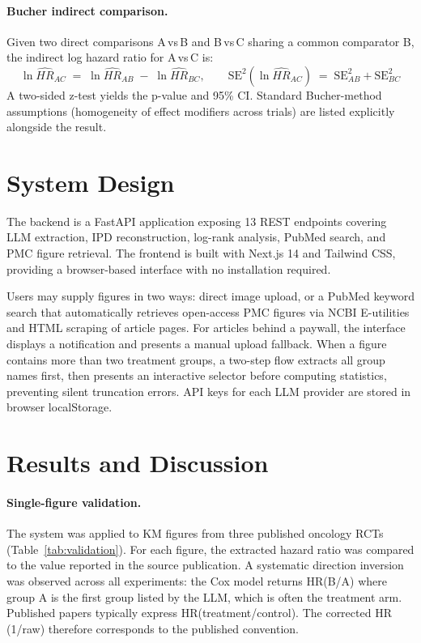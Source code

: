 \documentclass{amia}
\begin{document}
\paragraph{Bucher indirect comparison.}
Given two direct comparisons A\,vs\,B and B\,vs\,C sharing a common
comparator B, the indirect log hazard ratio for A\,vs\,C is:
\[
  \ln\widehat{HR}_{AC} \;=\; \ln\widehat{HR}_{AB} \;-\; \ln\widehat{HR}_{BC},
  \qquad
  \mathrm{SE}^2(\ln\widehat{HR}_{AC}) \;=\;
      \mathrm{SE}^2_{AB} + \mathrm{SE}^2_{BC}
\]
A two-sided z-test yields the p-value and 95\% CI\cite{bucher1997}.
Standard Bucher-method assumptions (homogeneity of effect modifiers across
trials) are listed explicitly alongside the result.

\section*{System Design}

The backend is a FastAPI application exposing 13 REST endpoints covering LLM
extraction, IPD reconstruction, log-rank analysis, PubMed search, and PMC
figure retrieval. The frontend is built with Next.js 14 and Tailwind CSS,
providing a browser-based interface with no installation required.

Users may supply figures in two ways: direct image upload, or a PubMed
keyword search that automatically retrieves open-access PMC figures via NCBI
E-utilities and HTML scraping of article pages. For articles behind a
paywall, the interface displays a notification and presents a manual upload
fallback. When a figure contains more than two treatment groups, a two-step
flow extracts all group names first, then presents an interactive selector
before computing statistics, preventing silent truncation errors. API keys
for each LLM provider are stored in browser localStorage.

\section*{Results and Discussion}

\paragraph{Single-figure validation.}
The system was applied to KM figures from three published oncology RCTs
(Table~\ref{tab:validation}). For each figure, the extracted hazard ratio
was compared to the value reported in the source publication. A systematic
direction inversion was observed across all experiments: the Cox model
returns HR(B/A) where group A is the first group listed by the LLM, which
is often the treatment arm. Published papers typically express
HR(treatment/control). The corrected HR (1/raw) therefore corresponds to
the published convention.
\end{document}
